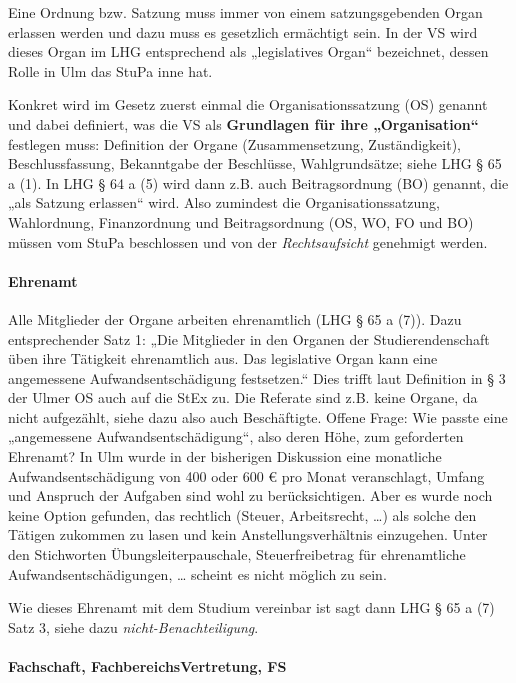 \documentclass[
10pt,
a4paper,
twoside,								%
titlepage=false,							%
draft=false								%
]{scrartcl}
\begin{document}
Eine Ordnung bzw. Satzung muss immer von einem satzungsgebenden Organ erlassen werden und dazu muss es gesetzlich ermächtigt sein. In der VS wird dieses Organ im LHG entsprechend als „legislatives Organ“ bezeichnet, dessen Rolle in Ulm das StuPa inne hat.


Konkret wird im Gesetz zuerst einmal die Organisationssatzung (OS) genannt und dabei definiert, was die VS als \textbf{Grundlagen für ihre „Organisation“} festlegen muss: Definition der Organe (Zusammensetzung, Zuständigkeit), Beschlussfassung, Bekanntgabe der Beschlüsse, Wahlgrundsätze; siehe LHG § 65 a (1). In LHG § 64 a (5) wird dann z.B. auch Beitragsordnung (BO) genannt, die „als Satzung erlassen“ wird. Also zumindest die Organisationssatzung, Wahlordnung, Finanzordnung und Beitragsordnung (OS, WO, FO und BO) müssen vom StuPa beschlossen und von der \emph{Rechtsaufsicht} genehmigt werden.


\paragraph{Ehrenamt}

Alle Mitglieder der Organe arbeiten ehrenamtlich (LHG § 65 a (7)). Dazu entsprechender Satz 1: „Die Mitglieder in den Organen der Studierendenschaft üben ihre Tätigkeit ehrenamtlich aus. Das legislative Organ kann eine angemessene Aufwandsentschädigung festsetzen.“ Dies trifft laut Definition in § 3 der Ulmer OS auch auf die StEx zu. Die Referate sind z.B. keine Organe, da nicht aufgezählt, siehe dazu also auch Beschäftigte.
Offene Frage: Wie passte eine „angemessene Aufwandsentschädigung“, also deren Höhe, zum geforderten Ehrenamt? In Ulm wurde in der bisherigen Diskussion eine monatliche Aufwandsentschädigung von 400 oder 600 € pro Monat veranschlagt, Umfang und Anspruch der Aufgaben sind wohl zu berücksichtigen. Aber es wurde noch keine Option gefunden, das rechtlich (Steuer, Arbeitsrecht, …) als solche den Tätigen zukommen zu lasen und kein Anstellungsverhältnis einzugehen. Unter den Stichworten Übungsleiterpauschale, Steuerfreibetrag für ehrenamtliche Aufwandsentschädigungen, … scheint es nicht möglich zu sein.

Wie dieses Ehrenamt mit dem Studium vereinbar ist sagt dann LHG § 65 a (7) Satz 3, siehe dazu \emph{nicht-Benachteiligung}.


\paragraph{Fachschaft, FachbereichsVertretung, FS}
\end{document}
